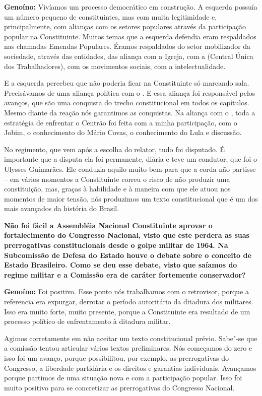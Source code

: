\textbf{Genoíno:} Vivíamos um processo democrático em construção. A
esquerda possuía um número pequeno de constituintes, mas com muita
legitimidade e, principalmente, com alianças com os setores populares
através da participação popular na Constituinte. Muitos temas que a
esquerda defendia eram respaldados nas chamadas Emendas Populares.
Éramos respaldados do setor mobilizador da sociedade, através das
entidades, das aliança com a Igreja, com a  (Central Única dos
Trabalhadores), com os movimentos sociais, com a intelectualidade.

E a esquerda percebeu que não poderia ficar na Constituinte só marcando
sala. Precisávamos de uma aliança política com o . E essa aliança
foi responsável pelos avanços, que são uma conquista do trecho
constitucional em todos os capítulos. Mesmo diante da reação nós
garantimos as conquistas. Na aliança com o , toda a estratégia de
enfrentar o Centrão foi feita com a minha participação, com o Jobim, o
conhecimento do Mário Covas, o conhecimento do Lula e discussão.

No regimento, que vem após a escolha do relator, tudo foi disputado. É
importante que a disputa ela foi permanente, diária e teve um condutor,
que foi o Ulysses Guimarães. Ele conduzia aquilo muito bem para que a
corda não partisse -- em vários momentos a Constituinte correu o risco
de não produzir uma constituição, mas, graças à habilidade e à maneira
com que ele atuou nos momentos de maior tensão, nós produzimos um texto
constitucional que é um dos mais avançados da história do Brasil.

\textbf{Não foi fácil a Assembléia Nacional Constituinte aprovar o
fortalecimento do Congresso Nacional, visto que este perdera as suas
prerrogativas constitucionais desde o golpe militar de 1964. Na
Subcomissão de Defesa do Estado houve o debate sobre o conceito de
Estado Brasileiro. Como se deu esse debate, visto que saíamos do regime
militar e a Comissão era de caráter fortemente conservador?}

\textbf{Genoíno:} Foi positivo. Esse ponto nós trabalhamos com o
retrovisor, porque a referencia era expurgar, derrotar o período
autoritário da ditadura dos militares. Isso era muito forte, muito
presente, porque a Constituinte era resultado de um processo político de
enfrentamento à ditadura militar.

Agimos corretamente em não aceitar um texto constitucional prévio.
Sabe"-se que a comissão tentou articular vários textos preliminares. Nós
começamos do zero e isso foi um avanço, porque possibilitou, por
exemplo, as prerrogativas do Congresso, a liberdade partidária e os
direitos e garantias individuais. Avançamos porque partimos de uma
situação nova e com a participação popular. Isso foi muito positivo para
se concretizar as prerrogativas do Congresso Nacional.

